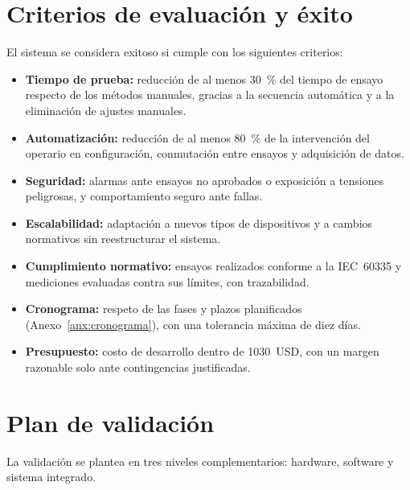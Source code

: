 \section{Criterios de evaluación y éxito}
\label{sec:criterios_evaluacion}

El sistema se considera exitoso si cumple con los siguientes criterios:
\begin{itemize}
    \item \textbf{Tiempo de prueba:} reducción de al menos \SI{30}{\percent} del
          tiempo de ensayo respecto de los métodos manuales, gracias a la
          secuencia automática y a la eliminación de ajustes manuales.
    \item \textbf{Automatización:} reducción de al menos \SI{80}{\percent} de la
          intervención del operario en configuración, conmutación entre ensayos y
          adquisición de datos.
    \item \textbf{Seguridad:} alarmas ante ensayos no aprobados o exposición a
          tensiones peligrosas, y comportamiento seguro ante fallas.
    \item \textbf{Escalabilidad:} adaptación a nuevos tipos de dispositivos y a
          cambios normativos sin reestructurar el sistema.
    \item \textbf{Cumplimiento normativo:} ensayos realizados conforme a la
          IEC~60335 y mediciones evaluadas contra sus límites, con trazabilidad.
    \item \textbf{Cronograma:} respeto de las fases y plazos planificados
          (Anexo~\ref{anx:cronograma}), con una tolerancia máxima de diez días.
    \item \textbf{Presupuesto:} costo de desarrollo dentro de \SI{1030}{USD},
          con un margen razonable solo ante contingencias justificadas.
\end{itemize}

\section{Plan de validación}
\label{sec:plan_validacion}

La validación se plantea en tres niveles complementarios: hardware, software y
sistema integrado.


